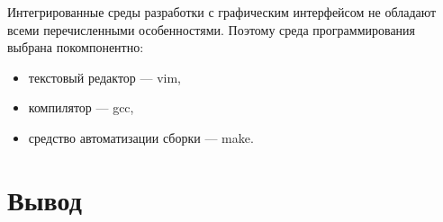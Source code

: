 Интегрированные среды разработки с графическим интерфейсом не обладают всеми перечисленными особенностями.
Поэтому среда программирования выбрана покомпонентно:
\begin{itemize}
	\item текстовый редактор — vim,
	\item компилятор — gcc,
	\item средство автоматизации сборки — make.
\end{itemize}

\section*{Вывод}
